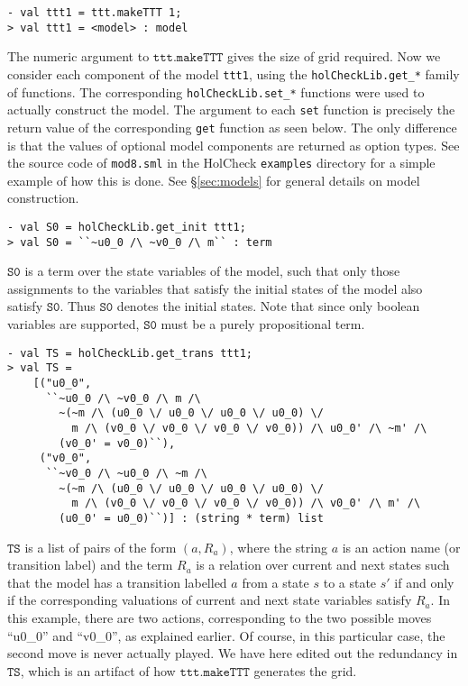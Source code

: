 \begin{session}\begin{verbatim}
- val ttt1 = ttt.makeTTT 1;
> val ttt1 = <model> : model
\end{verbatim}\end{session}

The numeric argument to \(\mathtt{ttt.makeTTT}\) gives the size of grid required.  Now we consider each component of the model \texttt{ttt1}, using the \texttt{holCheckLib.get\_*} family of functions. The corresponding \texttt{holCheckLib.set\_*} functions were used to actually construct the model. The argument to each \texttt{set} function is precisely the return value of the corresponding \texttt{get} function as seen below. The only difference is that the values of optional model components are returned as option types. See the source code of \texttt{mod8.sml} in the HolCheck \texttt{examples} directory for a simple example of how this is done. See \S\ref{sec:models} for general details on model construction.

\begin{session}\begin{verbatim}
- val S0 = holCheckLib.get_init ttt1;
> val S0 = ``~u0_0 /\ ~v0_0 /\ m`` : term
\end{verbatim}\end{session}

\(\mathtt{S0}\) is a term over the state variables of the model, such that only those assignments to the variables that satisfy the initial states of the model also satisfy \(\mathtt{S0}\). Thus \(\mathtt{S0}\) denotes the initial states. Note that since only boolean variables are supported, \(\mathtt{S0}\) must be a purely propositional term.

\begin{session}\begin{verbatim}
- val TS = holCheckLib.get_trans ttt1;
> val TS =
    [("u0_0",
      ``~u0_0 /\ ~v0_0 /\ m /\
        ~(~m /\ (u0_0 \/ u0_0 \/ u0_0 \/ u0_0) \/
          m /\ (v0_0 \/ v0_0 \/ v0_0 \/ v0_0)) /\ u0_0' /\ ~m' /\
        (v0_0' = v0_0)``),
     ("v0_0",
      ``~v0_0 /\ ~u0_0 /\ ~m /\
        ~(~m /\ (u0_0 \/ u0_0 \/ u0_0 \/ u0_0) \/
          m /\ (v0_0 \/ v0_0 \/ v0_0 \/ v0_0)) /\ v0_0' /\ m' /\
        (u0_0' = u0_0)``)] : (string * term) list
\end{verbatim}\end{session}

\(\mathtt{TS}\) is a list of pairs of the form \( (a,R_a)\), where the string \(a\) is an action name (or transition label) and the \HOL{} term \(R_a\) is a relation over current and next states such that the model has a transition labelled \(a\) from a state \( s \) to a state \(s'\) if and only if the corresponding valuations of current and next state variables satisfy \( R_a \). In this example, there are two actions, corresponding to the two possible moves ``u0\_0'' and ``v0\_0'', as explained earlier. Of course, in this particular case, the second move is never actually played. We have here edited out the redundancy in \(\mathtt{TS}\), which is an artifact of how \(\mathtt{ttt.makeTTT}\) generates the grid.

